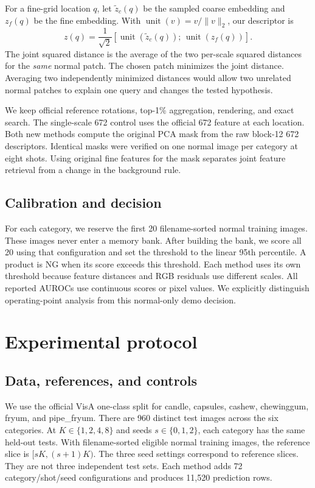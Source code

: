 \documentclass[10pt,twocolumn,letterpaper]{article}
\begin{document}
For a fine-grid location \(q\), let \(\tilde z_c(q)\) be the sampled coarse embedding and \(z_f(q)\) be the fine embedding. With \(\operatorname{unit}(v)=v/\|v\|_2\), our descriptor is
\[
 z(q)=\frac{1}{\sqrt{2}}
   \left[\operatorname{unit}(\tilde z_c(q));\,
         \operatorname{unit}(z_f(q))\right].
\]
The joint squared distance is the average of the two per-scale squared distances for the \emph{same} normal patch. The chosen patch minimizes the joint distance. Averaging two independently minimized distances would allow two unrelated normal patches to explain one query and changes the tested hypothesis.

We keep official reference rotations, top-1\% aggregation, rendering, and exact search. The single-scale 672 control uses the official 672 feature at each location. Both new methods compute the original PCA mask from the raw block-12 672 descriptors. Identical masks were verified on one normal image per category at eight shots. Using original fine features for the mask separates joint feature retrieval from a change in the background rule.

\subsection{Calibration and decision}
For each category, we reserve the first 20 filename-sorted normal training images. These images never enter a memory bank. After building the bank, we score all 20 using that configuration and set the threshold to the linear 95th percentile. A product is NG when its score exceeds this threshold. Each method uses its own threshold because feature distances and RGB residuals use different scales. All reported AUROCs use continuous scores or pixel values. We explicitly distinguish operating-point analysis from this normal-only demo decision.

\section{Experimental protocol}
\subsection{Data, references, and controls}
We use the official VisA one-class split for candle, capsules, cashew, chewinggum, fryum, and pipe\_fryum. There are 960 distinct test images across the six categories. At \(K\in\{1,2,4,8\}\) and seeds \(s\in\{0,1,2\}\), each category has the same held-out tests. With filename-sorted eligible normal training images, the reference slice is \([sK,(s+1)K)\). The three seed settings correspond to reference slices. They are not three independent test sets. Each method adds 72 category/shot/seed configurations and produces 11,520 prediction rows.
\end{document}
